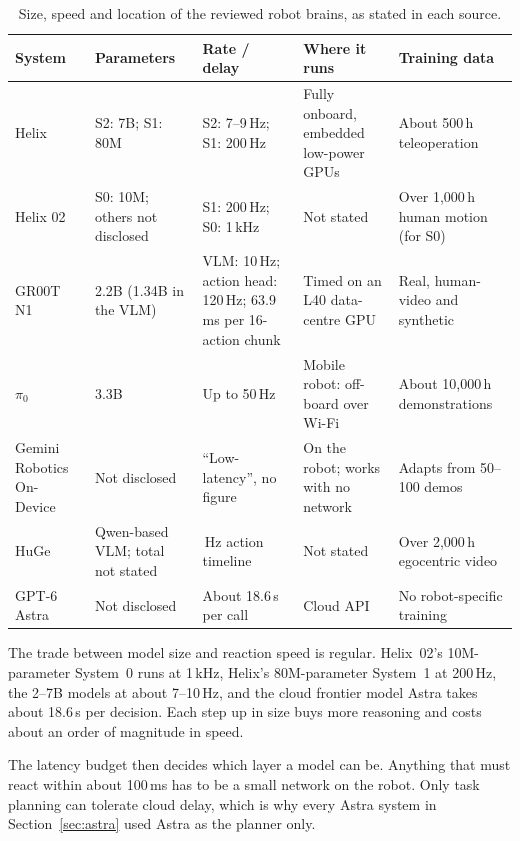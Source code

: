 \documentclass[11pt,a4paper]{article}
\begin{document}
\begin{table}[H]
\centering\small
\renewcommand{\arraystretch}{1.25}
\begin{tabularx}{\textwidth}{>{\raggedright\arraybackslash}p{2.3cm}
  >{\raggedright\arraybackslash}p{2.3cm} >{\raggedright\arraybackslash}X
  >{\raggedright\arraybackslash}p{2.7cm} >{\raggedright\arraybackslash}p{2.4cm}}
\toprule
System & Parameters & Rate / delay & Where it runs & Training data \\
\midrule
Helix~\cite{helix-2025} & S2: 7B; S1: 80M & S2: 7--9\,Hz; S1: 200\,Hz &
Fully onboard, embedded low-power GPUs & About 500\,h teleoperation \\
Helix 02~\cite{helix-02} & S0: 10M; others not disclosed & S1: 200\,Hz;
S0: 1\,kHz & Not stated & Over 1{,}000\,h human motion (for S0) \\
GR00T N1~\cite{groot-n1} & 2.2B (1.34B in the VLM) & VLM: 10\,Hz; action
head: 120\,Hz; 63.9\,ms per 16-action chunk & Timed on an L40 data-centre
GPU & Real, human-video and synthetic \\
$\pi_0$~\cite{pi0} & 3.3B & Up to 50\,Hz & Mobile robot: off-board over
Wi-Fi & About 10{,}000\,h demonstrations \\
Gemini Robotics On-Device~\cite{gemini-ondevice} & Not disclosed &
``Low-latency'', no figure & On the robot; works with no network &
Adapts from 50--100 demos \\
HuGe~\cite{huge-2026} & Qwen-based VLM; total not stated & 50\,Hz action
timeline & Not stated & Over 2{,}000\,h egocentric video \\
GPT-6 Astra~\cite{astranomy-2026} & Not disclosed & About 18.6\,s per call &
Cloud API & No robot-specific training \\
\bottomrule
\end{tabularx}
\caption{Size, speed and location of the reviewed robot brains, as stated in
each source.}
\label{tab:sizes}
\end{table}


\noindent
The trade between model size and reaction speed is regular.  Helix~02's
10M-parameter System~0 runs at 1\,kHz, Helix's 80M-parameter System~1 at
200\,Hz, the 2--7B models at about 7--10\,Hz, and the cloud frontier model
Astra takes about 18.6\,s per decision.  Each step up in size buys more
reasoning and costs about an order of magnitude in speed.

The latency budget then decides which layer a model can be.  Anything that
must react within about 100\,ms has to be a small network on the robot.  Only
task planning can tolerate cloud delay, which is why every Astra system in
Section~\ref{sec:astra} used Astra as the planner only.
\end{document}
